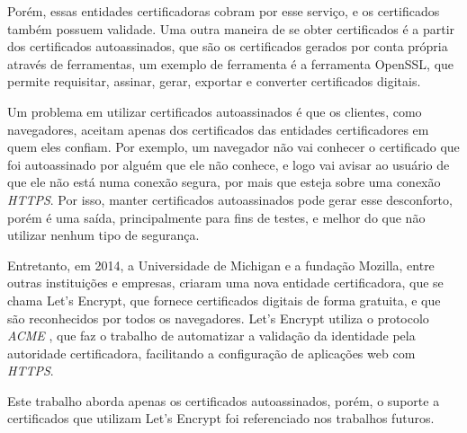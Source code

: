 Porém, essas entidades certificadoras cobram por esse serviço, e os certificados também
possuem validade. Uma outra maneira de se obter certificados é a partir dos certificados
autoassinados, que são os certificados gerados por conta própria através de
ferramentas, um exemplo de ferramenta é a ferramenta OpenSSL, que permite requisitar,
assinar, gerar, exportar e converter certificados digitais.

Um problema em utilizar certificados autoassinados é que os clientes, como navegadores,
aceitam apenas dos certificados das entidades certificadores em quem eles confiam. Por
exemplo, um navegador não vai conhecer o certificado que foi autoassinado por
alguém que ele não conhece, e logo vai avisar ao usuário de que ele não está numa
conexão segura, por mais que esteja sobre uma conexão \textit{HTTPS}. Por isso, 
manter certificados
autoassinados pode gerar esse desconforto, porém é uma saída, principalmente para
fins de testes, e melhor do que não utilizar nenhum tipo de segurança.

Entretanto, em 2014, a Universidade de Michigan e a fundação Mozilla, entre outras 
instituições e empresas, criaram uma nova entidade certificadora, que se chama 
Let's Encrypt, que fornece certificados digitais de forma gratuita, e que são 
reconhecidos por todos os navegadores. Let's Encrypt utiliza o protocolo \textit{ACME} \cite{ACME}, que faz o trabalho de automatizar a validação da identidade pela autoridade 
certificadora, facilitando a configuração de aplicações web com \textit{HTTPS}. 

Este trabalho aborda apenas os certificados autoassinados, porém, o suporte
a certificados que utilizam Let's Encrypt foi referenciado nos trabalhos futuros.
